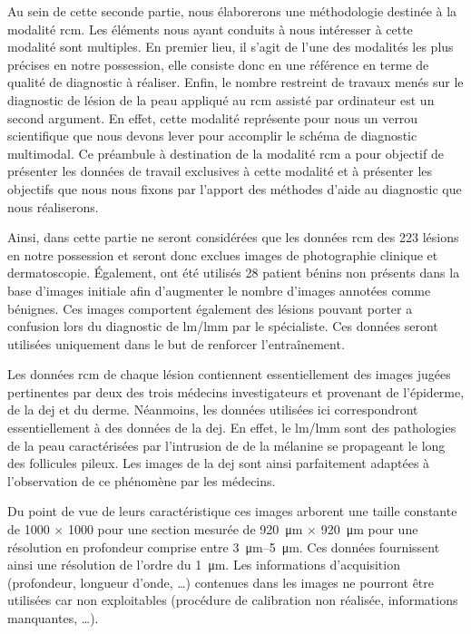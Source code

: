 \renewcommand{\thechapter}{\roman{chapter}}
\setcounter{chapter}{3}
\setcounter{figure}{0}

\label{chap:preamble_microscopy}
Au sein de cette seconde partie, nous élaborerons une méthodologie destinée à la modalité \gls{rcm}. Les éléments nous ayant conduits à nous intéresser à cette modalité sont multiples. En premier lieu, il s'agit de l'une des modalités les plus précises en notre possession, elle consiste donc en une référence en terme de qualité de diagnostic à réaliser. Enfin, le nombre restreint de travaux menés sur le diagnostic de lésion de la peau appliqué au \gls{rcm} assisté par ordinateur est un second argument. En effet, cette modalité représente pour nous un verrou scientifique que nous devons lever pour accomplir le schéma de diagnostic multimodal. Ce préambule à destination de la modalité \gls{rcm} a pour objectif de présenter les données de travail exclusives à cette modalité et à présenter les objectifs que nous nous fixons par l'apport des méthodes d'aide au diagnostic que nous réaliserons.\par

Ainsi, dans cette partie ne seront considérées que les données \gls{rcm} des 223 lésions en notre possession et seront donc exclues images de photographie clinique et dermatoscopie. Également, ont été utilisés 28 patient bénins non présents dans la base d'images initiale afin d'augmenter le nombre d'images annotées comme bénignes. Ces images comportent également des lésions pouvant porter a confusion lors du diagnostic de \gls{lm}/\gls{lmm} par le spécialiste. Ces données seront utilisées uniquement dans le but de renforcer l'entraînement.\par

Les données \gls{rcm} de chaque lésion contiennent essentiellement des images jugées pertinentes par deux des trois médecins investigateurs et provenant de l'épiderme, de la \gls{dej} et du derme. Néanmoins, les données utilisées ici correspondront essentiellement à des données de la \gls{dej}. En effet, le \gls{lm}/\gls{lmm} sont des pathologies de la peau caractérisées par l'intrusion de de la mélanine se propageant le long des follicules pileux. Les images de la \gls{dej} sont ainsi parfaitement adaptées à l'observation de ce phénomène par les médecins.\par

Du point de vue de leurs caractéristique ces images arborent une taille constante de \SI{1000}{\px} $\times$ \SI{1000}{\px} pour une section mesurée de \SI{920}{\micro\metre} $\times$ \SI{920}{\micro\metre} pour une résolution en profondeur comprise entre \SIrange{3}{5}{\micro\metre}. Ces données fournissent ainsi une résolution de l'ordre du \SI{1}{\micro\metre}. Les informations d'acquisition (profondeur, longueur d'onde, \ldots) contenues dans les images ne pourront être utilisées car non exploitables (procédure de calibration non réalisée, informations manquantes, \ldots).\par

